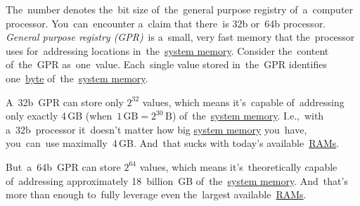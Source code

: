 \label{32bvs64b}
The~number denotes the~bit size of~the~general purpose registry of~a~computer processor.
You~can~encounter a~claim that there~is 32b or~64b processor.
\textit{General purpose registry (GPR)}~is a~small, very fast memory that the~processor uses for~addressing locations in~the~\hyperref[systemmemory]{system memory}.
Consider the~content of~the~GPR as~one~value.
Each~single value stored in~the~GPR identifies one~\hyperref[bitsbytes]{byte} of~the~\hyperref[systemmemory]{system memory}.

A~32b~GPR can store only $2^{32}$ values, which means it's~capable of~addressing only exactly 4\,GB (when~$1\,\textrm{GB}=2^{30}\,\textrm{B}$) of~the~\hyperref[systemmemory]{system memory}.
I.e.,~with a~32b~processor it~doesn't matter how big \hyperref[systemmemory]{system memory} you~have, you~can~use maximally~4\,GB\@.
And~that sucks with today's available~\hyperref[ram]{RAMs}.

But~a~64b~GPR can store $2^{64}$ values, which means it's~theoretically capable of~addressing approximately 18~billion~GB of~the~\hyperref[systemmemory]{system memory}.
And~that's more than enough to~fully leverage even the~largest available~\hyperref[ram]{RAMs}.
